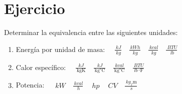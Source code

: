 \section{Ejercicio}\label{ej:Chap01Ejercicio02}

Determinar la equivalencia entre las siguientes unidades:
\begin{enumerate}
    \item Energía por unidad de masa: $\quad\frac{\SI{}{kJ}}{\SI{}{kg}}\quad\frac{\SI{}{kWh}}{\SI{}{kg}}\quad\frac{\SI{}{kcal}}{\SI{}{kg}}\quad\frac{\SI{}{BTU}}{\SI{}{lb}}$
    \item Calor específico: $\quad\frac{\SI{}{kJ}}{\SI{}{\kg\kelvin}}\quad\frac{\SI{}{kJ}}{\SI{}{\kg\celsius}}\quad\frac{\SI{}{kcal}}{\SI{}{\kg\celsius}}\quad\frac{\SI{}{BTU}}{\SI{}{lb}\,^\circ\text{F}}$
    \item Potencia: $\quad\SI{}{kW}\quad\frac{\SI{}{kcal}}{\SI{}{h}}\quad\SI{}{hp}\quad\SI{}{CV}\quad\frac{\SI{}{kg_f\meter}}{\SI{}{s}}$
\end{enumerate}
